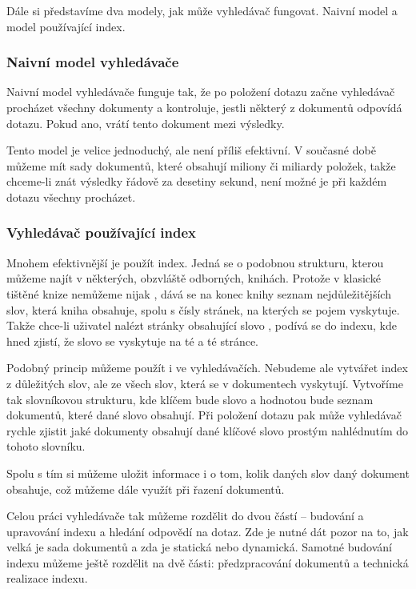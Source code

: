 \documentclass[12pt]{article}
\begin{document}
Dále si představíme dva modely, jak může vyhledávač fungovat. Naivní model a model používající index.

\subsubsection{Naivní model vyhledávače}

Naivní model vyhledávače funguje tak, že po položení dotazu začne vyhledávač procházet všechny dokumenty a kontroluje, jestli některý z dokumentů odpovídá dotazu. Pokud ano, vrátí tento dokument mezi výsledky. 

Tento model je velice jednoduchý, ale není příliš efektivní. V současné době můžeme mít sady dokumentů, které obsahují miliony či miliardy položek, takže chceme-li znát výsledky řádově za desetiny sekund, není možné je při každém dotazu všechny procházet.

\subsubsection{Vyhledávač používající index}
Mnohem efektivnější je použít index. Jedná se o podobnou strukturu, kterou můžeme najít v některých, obzvláště odborných, knihách. Protože v klasické tištěné knize nemůžeme nijak , dává se na konec knihy seznam nejdůležitějších slov, která kniha obsahuje, spolu s čísly stránek, na kterých se pojem vyskytuje. Takže chce-li uživatel nalézt stránky obsahující slovo , podívá se do indexu, kde hned zjistí, že slovo se vyskytuje na té a té stránce. 

Podobný princip můžeme použít i ve vyhledávačích. Nebudeme ale vytvářet index z důležitých slov, ale ze všech slov, která se v dokumentech vyskytují. Vytvoříme tak slovníkovou strukturu, kde klíčem bude slovo a hodnotou bude seznam dokumentů, které dané slovo obsahují. Při položení dotazu pak může vyhledávač rychle zjistit jaké dokumenty obsahují dané klíčové slovo prostým nahlédnutím do tohoto slovníku. 

Spolu s tím si můžeme uložit informace i o tom, kolik daných slov daný dokument obsahuje, což můžeme dále využít při řazení dokumentů. 

Celou práci vyhledávače tak můžeme rozdělit do dvou částí -- budování a upravování indexu a hledání odpovědí na dotaz. Zde je nutné dát pozor na to, jak velká je sada dokumentů a zda je statická nebo dynamická. Samotné budování indexu můžeme ještě rozdělit na dvě části: předzpracování dokumentů a technická realizace indexu. 
\end{document}
